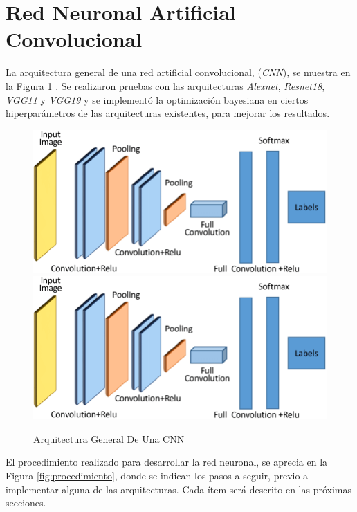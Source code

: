 \section{Red Neuronal Artificial Convolucional}

La arquitectura general de una red artificial convolucional, (\textit{CNN}), se muestra en la Figura \ref{fig:cnnarchitecture} \cite{cnnarchitecture}. Se realizaron pruebas con las arquitecturas \textit{Alexnet}, \textit{Resnet18}, \textit{VGG11} y \textit{VGG19} y se implementó la optimización bayesiana en ciertos hiperparámetros de las arquitecturas existentes, para mejorar los resultados. 

\begin{figure}[ht]
	\centering
	\includegraphics[scale=0.15]{Figs/A-generic-CNN-Architecture.png}
	\includegraphics[scale=0.18]{Figs/A-generic-CNN-Architecture.png}
	\caption{Arquitectura General De Una CNN}
	\label{fig:cnnarchitecture}
\end{figure}	

El procedimiento realizado para desarrollar la red neuronal, se aprecia en la Figura \ref{fig:procedimiento}, donde se indican los pasos a seguir, previo a implementar alguna de las arquitecturas. Cada ítem será descrito en las próximas secciones.  

